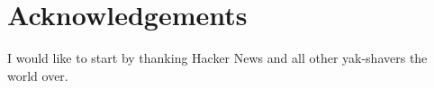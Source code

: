 \chapter*{Acknowledgements}

I would like to start by thanking Hacker News and all other yak-shavers the world over.
